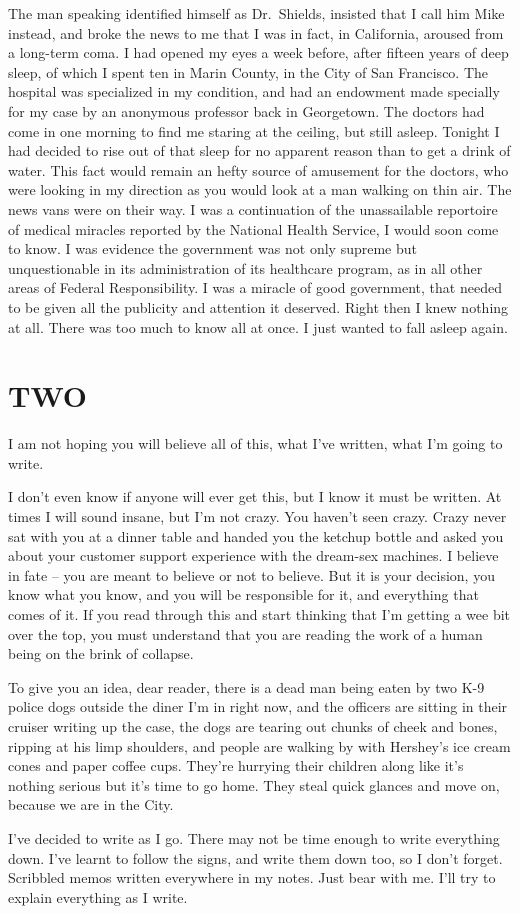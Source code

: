 The man speaking identified himself as Dr.~Shields, insisted that I call him Mike instead, and broke the news to me that I was in fact, in California, aroused from a long-term coma. I had opened my eyes a week before, after fifteen years of deep sleep, of which I spent ten in Marin County, in the City of San Francisco. The hospital was specialized in my condition, and had an endowment made specially for my case by an anonymous professor back in Georgetown. The doctors  had come  in one morning to find me staring at the ceiling, but still asleep. Tonight I had decided to rise out of that sleep for no apparent reason than to get a drink of water. This fact would remain an hefty source of amusement for the doctors, who were looking in my direction as you would look at a man walking on thin air. The news vans were on their way. I was a continuation of the unassailable reportoire of medical miracles reported by the National Health Service, I would soon come to know. I was evidence the government was not only supreme but unquestionable in its administration of its healthcare program, as in all other areas of Federal Responsibility. I was a miracle of good government, that needed to be given all the publicity and attention it deserved. Right then I knew nothing at all. There was too much to know all at once. I just wanted to fall asleep again.

\chapter*{TWO}

I am not hoping you will believe all of this, what I've written, what I'm going to write. 

I don't even know if anyone will ever get this, but I know it must be written. At times I will sound insane, but I'm not crazy. You haven't seen crazy. Crazy never sat with you at a dinner table and handed you the ketchup bottle and asked you about your customer support experience with the dream-sex machines. I believe in fate -- you are meant to believe or not to believe. But it is your decision, you know what you know, and you will be responsible for it, and everything that comes of it. If you read through this and start thinking that I'm getting a wee bit over the top, you must understand that you are reading the work of a human being on the brink of collapse.

To give you an idea, dear reader, there is a dead man being eaten by two K-9 police dogs outside the diner I'm in right now, and the officers are sitting in their cruiser writing up the case, the dogs are tearing out chunks of cheek and bones, ripping at his limp shoulders, and people are walking by with Hershey's ice cream cones and paper coffee cups. They're hurrying their children along like it's nothing serious but it's time to go home. They steal quick glances and move on, because we are in the City.

I've decided to write as I go. There may not be time enough to write everything down. I've learnt to follow the signs, and write them down too, so I don't forget. Scribbled memos written everywhere in my notes. Just bear with me. I'll try to explain everything as I write.


